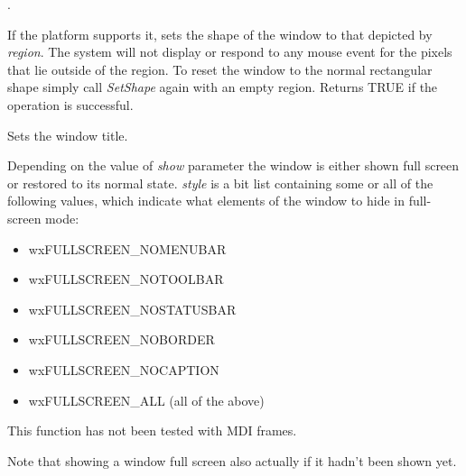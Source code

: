 .


\label{wxtoplevelwindowsetshape}


If the platform supports it, sets the shape of the window to that
depicted by {\it region}.  The system will not display or
respond to any mouse event for the pixels that lie outside of the
region.  To reset the window to the normal rectangular shape simply
call {\it SetShape} again with an empty region.  Returns TRUE if the
operation is successful.


\label{wxtoplevelwindowsettitle}


Sets the window title.






\label{wxtoplevelwindowshowfullscreen}


Depending on the value of {\it show} parameter the window is either shown full
screen or restored to its normal state. {\it style} is a bit list containing
some or all of the following values, which indicate what elements of the window
to hide in full-screen mode:

\begin{itemize}\itemsep=0pt
\item wxFULLSCREEN\_NOMENUBAR
\item wxFULLSCREEN\_NOTOOLBAR
\item wxFULLSCREEN\_NOSTATUSBAR
\item wxFULLSCREEN\_NOBORDER
\item wxFULLSCREEN\_NOCAPTION
\item wxFULLSCREEN\_ALL (all of the above)
\end{itemize}

This function has not been tested with MDI frames.

Note that showing a window full screen also actually
 if it hadn't been shown yet.



